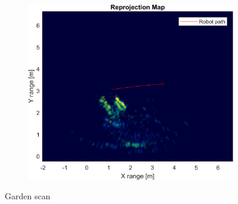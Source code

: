 \begin{figure}[htbp]
\begin{subfigure}[t]{0.5\linewidth}
        \includegraphics[width=\linewidth,max height=.475\textheight]{gfx/results/garden_reprojection.png}
    \end{subfigure}%
    \caption{Garden scan}
\end{figure}


